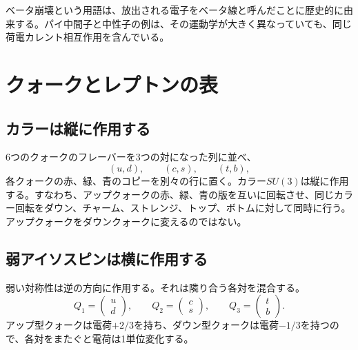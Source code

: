 
ベータ崩壊という用語は、放出される電子をベータ線と呼んだことに歴史的に由来する。パイ中間子と中性子の例は、その運動学が大きく異なっていても、同じ荷電カレント相互作用を含んでいる。

\section{クォークとレプトンの表}

\subsection{カラーは縦に作用する}

6つのクォークのフレーバーを3つの対になった列に並べ、
\begin{equation}
(u,d),\qquad(c,s),\qquad(t,b),
\end{equation}
各クォークの赤、緑、青のコピーを別々の行に置く。カラー\(SU(3)\)は縦に作用する。すなわち、アップクォークの赤、緑、青の版を互いに回転させ、同じカラー回転をダウン、チャーム、ストレンジ、トップ、ボトムに対して同時に行う。アップクォークをダウンクォークに変えるのではない。

\subsection{弱アイソスピンは横に作用する}

弱い対称性は逆の方向に作用する。それは隣り合う各対を混合する。
\begin{equation}
Q_1=\begin{pmatrix}u\\d\end{pmatrix},
\qquad
Q_2=\begin{pmatrix}c\\s\end{pmatrix},
\qquad
Q_3=\begin{pmatrix}t\\b\end{pmatrix}.
\label{eq:l5-quark-doublets}
\end{equation}
アップ型クォークは電荷\(+2/3\)を持ち、ダウン型クォークは電荷\(-1/3\)を持つので、各対をまたぐと電荷は1単位変化する。

